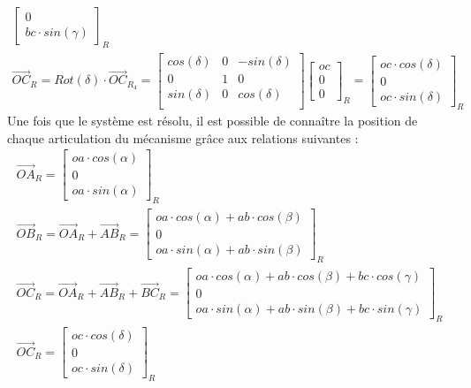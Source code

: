 \documentclass[12pt,a4paper]{article}
\begin{document}
\begin{eqnarray}
\begin{bmatrix}
0\\
bc \cdot sin(\gamma) 
\end{bmatrix}_{R}
\\
\vec{OC}_R = Rot(\delta) \cdot \vec{OC}_{R_4}=
\begin{bmatrix}
cos(\delta) & 0 &-sin(\delta)\\
0 & 1 & 0 \\
sin(\delta) & 0 & cos(\delta) \\
\end{bmatrix}
\begin{bmatrix}
oc \\
0 \\
0
\end{bmatrix}_{R} =
\begin{bmatrix}
oc \cdot cos(\delta) \\
0\\
oc \cdot sin(\delta) 
\end{bmatrix}_{R}
\end{eqnarray}
Une fois que le système est résolu, il est possible de connaître la position de chaque articulation du mécanisme grâce aux relations suivantes :
\begin{eqnarray}
\vec{OA}_R=
\begin{bmatrix}
oa \cdot cos(\alpha) \\
0\\
oa \cdot sin(\alpha) 
\end{bmatrix}_{R}
\\
\vec{OB}_R=\vec{OA}_R+\vec{AB}_R=
\begin{bmatrix}
oa \cdot cos(\alpha) +ab \cdot cos(\beta)\\
0\\
oa \cdot sin(\alpha) + ab \cdot sin(\beta)
\end{bmatrix}_{R}\\
\vec{OC}_R=\vec{OA}_R+\vec{AB}_R+\vec{ BC}_R =
\begin{bmatrix}
oa \cdot cos(\alpha) +ab \cdot cos(\beta)+bc \cdot cos(\gamma)\\
0\\
oa \cdot sin(\alpha) + ab \cdot sin(\beta)+bc \cdot sin(\gamma) 
\end{bmatrix}_{R} \\
\vec{OC}_R=
\begin{bmatrix}
oc \cdot cos(\delta) \\
0\\
oc \cdot sin(\delta) 
\end{bmatrix}_{R}
\end{eqnarray}
\newpage
\end{document}
